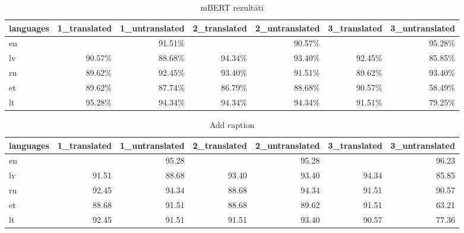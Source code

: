 \begin{table}[htbp]
  \centering
  \caption{mBERT rezultāti}
    \begin{tabular}{lrrrrrr} \toprule
    languages & 1\_translated & 1\_untranslated & 2\_translated & 2\_untranslated & 3\_translated & 3\_untranslated \\\midrule
    en    &       & \cellcolor[rgb]{ .988,  .988,  1}91.51\% &       & \cellcolor[rgb]{ .984,  .969,  .98}90.57\% &       & \cellcolor[rgb]{ .353,  .541,  .776}95.28\% \\
    lv    & \cellcolor[rgb]{ .984,  .969,  .98}90.57\% & \cellcolor[rgb]{ .984,  .937,  .949}88.68\% & \cellcolor[rgb]{ .514,  .655,  .835}94.34\% & \cellcolor[rgb]{ .671,  .765,  .89}93.40\% & \cellcolor[rgb]{ .831,  .878,  .945}92.45\% & \cellcolor[rgb]{ .984,  .886,  .898}85.85\% \\
    ru    & \cellcolor[rgb]{ .984,  .953,  .965}89.62\% & \cellcolor[rgb]{ .831,  .878,  .945}92.45\% & \cellcolor[rgb]{ .671,  .765,  .89}93.40\% & \cellcolor[rgb]{ .988,  .988,  1}91.51\% & \cellcolor[rgb]{ .984,  .953,  .965}89.62\% & \cellcolor[rgb]{ .671,  .765,  .89}93.40\% \\
    et    & \cellcolor[rgb]{ .984,  .953,  .965}89.62\% & \cellcolor[rgb]{ .984,  .922,  .933}87.74\% & \cellcolor[rgb]{ .984,  .906,  .914}86.79\% & \cellcolor[rgb]{ .984,  .937,  .949}88.68\% & \cellcolor[rgb]{ .984,  .969,  .98}90.57\% & \cellcolor[rgb]{ .973,  .412,  .42}58.49\% \\
    lt    & \cellcolor[rgb]{ .353,  .541,  .776}95.28\% & \cellcolor[rgb]{ .514,  .655,  .835}94.34\% & \cellcolor[rgb]{ .514,  .655,  .835}94.34\% & \cellcolor[rgb]{ .514,  .655,  .835}94.34\% & \cellcolor[rgb]{ .988,  .988,  1}91.51\% & \cellcolor[rgb]{ .98,  .773,  .784}79.25\% \\\bottomrule
    \end{tabular}%
  \label{tab:chatbot-bert}%
\end{table}%


\begin{table}[htbp]
  \centering
  \caption{Add caption}
    \begin{tabular}{lrrrrrr} \toprule
    languages & 1\_translated & 1\_untranslated & 2\_translated & 2\_untranslated & 3\_translated & 3\_untranslated \\\midrule
    en    &       & 95.28 &       & 95.28 &       & 96.23 \\
    lv    & 91.51 & 88.68 & 93.40 & 93.40 & 94.34 & 85.85 \\
    ru    & 92.45 & 94.34 & 88.68 & 94.34 & 91.51 & 90.57 \\
    et    & 88.68 & 91.51 & 88.68 & 89.62 & 91.51 & 63.21 \\
    lt    & 92.45 & 91.51 & 91.51 & 93.40 & 90.57 & 77.36 \\\bottomrule
    \end{tabular}%
  \label{tab:chatbot-xlm}%
\end{table}%


